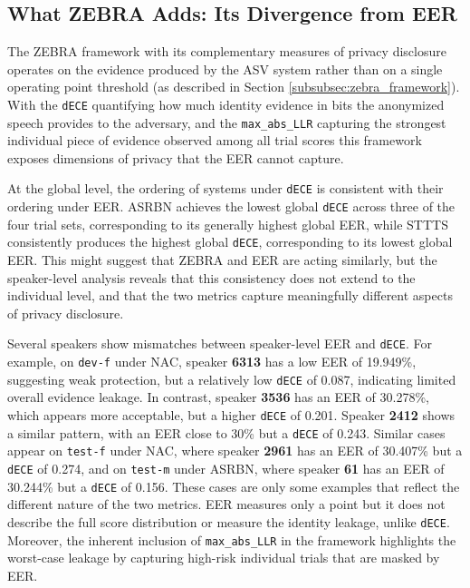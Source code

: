 \documentclass[12pt,leqno,a4paper]{article}
\begin{document}
\subsection{What ZEBRA Adds: Its Divergence from EER}
\label{subsubsec:what_zebra_adds}
The ZEBRA framework with its complementary measures of privacy disclosure operates on the evidence produced by the ASV system rather
than on a single operating point threshold (as described in Section \ref{subsubsec:zebra_framework}). With the \texttt{dECE} quantifying how much identity evidence in bits
the anonymized speech provides to the adversary, and the \texttt{max\_abs\_LLR} capturing the strongest individual piece of evidence observed among all trial scores 
this framework exposes dimensions of privacy that the EER cannot capture.

At the global level, the ordering of systems under \texttt{dECE} is consistent with their ordering under EER. 
ASRBN achieves the lowest global \texttt{dECE} across three of the four trial sets, corresponding to its generally highest global EER,
while STTTS consistently produces the highest global \texttt{dECE}, corresponding to its lowest global EER. 
This might suggest that ZEBRA and EER are acting similarly, but the speaker-level analysis reveals that this 
consistency does not extend to the individual level, and that the two metrics capture meaningfully different aspects of privacy disclosure.

Several speakers show mismatches between speaker-level EER and \texttt{dECE}. For example, on \texttt{dev-f} under NAC, speaker \textbf{6313}
has a low EER of 19.949\%, suggesting weak protection, but a relatively low \texttt{dECE} of 0.087, indicating limited overall evidence leakage. 
In contrast, speaker \textbf{3536} has an EER of 30.278\%, which appears more acceptable, but a higher \texttt{dECE} of 0.201. 
Speaker \textbf{2412} shows a similar pattern, with an EER close to 30\% but a \texttt{dECE} of 0.243. 
Similar cases appear on \texttt{test-f} under NAC, where speaker \textbf{2961} has an EER of 30.407\% but a \texttt{dECE} of 0.274, 
and on \texttt{test-m} under ASRBN, where speaker \textbf{61} has an EER of 30.244\% but a \texttt{dECE} of 0.156. These cases are only some examples
that reflect the different nature of the two metrics. EER measures only a point but it does not describe the full score distribution or measure the identity leakage, unlike \texttt{dECE}.
Moreover, the inherent inclusion of \texttt{max\_abs\_LLR} in the framework highlights the worst-case leakage by capturing high-risk individual trials that are masked by EER.
\end{document}
